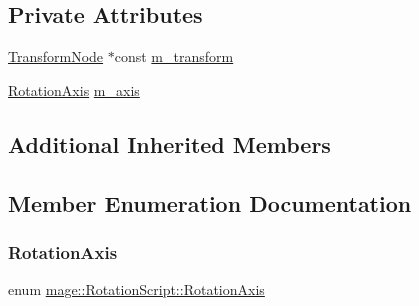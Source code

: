 \subsection*{Private Attributes}
\begin{DoxyCompactItemize}
\item 
\hyperlink{classmage_1_1_transform_node}{Transform\+Node} $\ast$const \hyperlink{classmage_1_1_rotation_script_a9dd84c2b928dece60bc1d72a16b20030}{m\+\_\+transform}
\item 
\hyperlink{classmage_1_1_rotation_script_ad06cf896ce6dfe4f6676b263d15b4ee9}{Rotation\+Axis} \hyperlink{classmage_1_1_rotation_script_a8fb1d0fb6e3dac1dd91f2d16e1954f21}{m\+\_\+axis}
\end{DoxyCompactItemize}
\subsection*{Additional Inherited Members}


\subsection{Member Enumeration Documentation}
\hypertarget{classmage_1_1_rotation_script_ad06cf896ce6dfe4f6676b263d15b4ee9}{}\label{classmage_1_1_rotation_script_ad06cf896ce6dfe4f6676b263d15b4ee9} 
\subsubsection{\texorpdfstring{Rotation\+Axis}{RotationAxis}}
{\footnotesize\ttfamily enum \hyperlink{classmage_1_1_rotation_script_ad06cf896ce6dfe4f6676b263d15b4ee9}{mage\+::\+Rotation\+Script\+::\+Rotation\+Axis}\hspace{0.3cm}{\ttfamily [strong]}}

